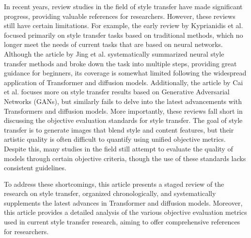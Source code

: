 \documentclass[preprint,12pt]{elsarticle}
\begin{document}
In recent years, review studies in the field of style transfer have made significant progress, providing valuable references for researchers. However, these reviews still have certain limitations. For example, the early review by Kyprianidis et al. \citep{21kyprianidis2012state} focused primarily on style transfer tasks based on traditional methods, which no longer meet the needs of current tasks that are based on neural networks. Although the article by Jing et al. \citep{79jing2019neural} systematically summarized neural style transfer methods and broke down the task into multiple steps, providing great guidance for beginners, its coverage is somewhat limited following the widespread application of Transformer and diffusion models. Additionally, the article by Cai et al. \citep{81cai2023image} focuses more on style transfer results based on Generative Adversarial Networks (GANs), but similarly fails to delve into the latest advancements with Transformers and diffusion models. More importantly, these reviews fall short in discussing the objective evaluation standards for style transfer. The goal of style transfer is to generate images that blend style and content features, but their artistic quality is often difficult to quantify using unified objective metrics. Despite this, many studies in the field still attempt to evaluate the quality of models through certain objective criteria, though the use of these standards lacks consistent guidelines.

To address these shortcomings, this article presents a staged review of the research on style transfer, organized chronologically, and systematically supplements the latest advances in Transformer and diffusion models. Moreover, this article provides a detailed analysis of the various objective evaluation metrics used in current style transfer research, aiming to offer comprehensive references for researchers.
\end{document}
